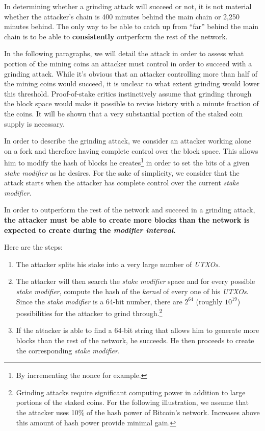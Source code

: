 \documentclass[a4paper,11pt]{article}
\begin{document}
In determining whether a grinding attack will succeed or not, it is not material whether the attacker's chain is 400 minutes behind the main chain or 2,250 minutes behind. The only way to be able to catch up from ``far'' behind the main chain is to be able to \textbf{consistently} outperform the rest of the network. 

In the following paragraphs, we will detail the attack in order to assess what portion of the mining coins an attacker must control in order to succeed with a grinding attack. While it's obvious that an attacker controlling more than half of the mining coins would succeed, it is unclear to what extent grinding would lower this threshold. Proof-of-stake critics instinctively assume that grinding through the block space would make it possible to revise history with a minute fraction of the coins. It will be shown that a very substantial portion of the staked coin supply is necessary. 

In order to describe the grinding attack, we consider an attacker working alone on a fork and therefore having complete control over the block space. This allows him to modify the hash of blocks he creates\footnote{By incrementing the nonce for example.} in order to set the bits of a given \textit{stake modifier} as he desires.
For the sake of simplicity, we consider that the attack starts when the attacker has complete control over the current \textit{stake modifier}. 

In order to outperform the rest of the network and succeed in a grinding attack, \textbf{the attacker must be able to create more blocks than the network is expected to create during the \textit{modifier interval}.}

Here are the steps:
\begin{enumerate}
\setlength{\itemsep}{0pt}
\item{The attacker splits his stake into a very large number of \textit{UTXOs}.}
\item{The attacker will then search the \textit{stake modifier} space and for every possible \textit{stake modifier}, compute the hash of the \textit{kernel} of every one of his \textit{UTXOs}. Since the \textit{stake modifier} is a 64-bit number, there are $2^{64}$ (roughly $10^{19}$) possibilities for the attacker to grind through.\footnote{Grinding attacks require significant computing power in addition to large portions of the staked coins. For the following illustration, we assume that the attacker uses 10\% of the hash power of Bitcoin's network. Increases above this amount of hash power provide minimal gain.}}
\item{If the attacker is able to find a 64-bit string that allows him to generate more blocks than the rest of the network, he succeeds. He then proceeds to create the corresponding \textit{stake modifier}.}

\end{enumerate}
\end{document}
